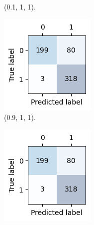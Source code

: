 \documentclass{article}
\begin{document}
\begin{figure}[ht]
\begin{subfigure}[b]{0.18\textwidth}
        \caption{(0.1, 1, 1).}
    \end{subfigure}
    \hfill
    \begin{subfigure}[b]{0.18\textwidth}
        \centering
        \includegraphics[width=\textwidth]{images/confusion_matrix_9_1_1.png}
        \caption{(0.9, 1, 1).}
    \end{subfigure}
    \hfill
    \begin{subfigure}[b]{0.18\textwidth}
        \centering
        \includegraphics[width=\textwidth]{images/confusion_matrix_5_1_9.png}

\end{subfigure}
\end{figure}
\end{document}
